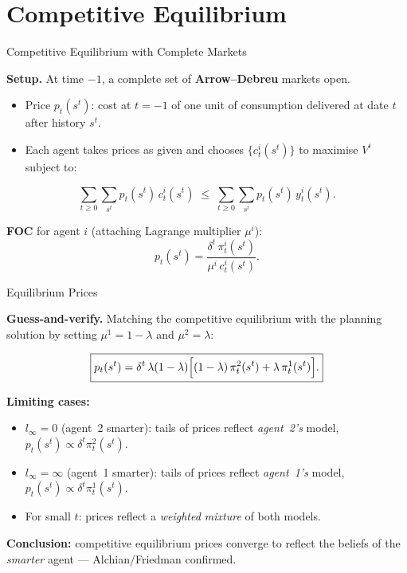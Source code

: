 \documentclass[aspectratio=169,12pt]{beamer}
\begin{document}
\section{Competitive Equilibrium}

\begin{frame}{Competitive Equilibrium with Complete Markets}

\textbf{Setup.} At time $-1$, a complete set of \textbf{Arrow--Debreu} markets open.

\begin{itemize}
  \item Price $p_t(s^t)$: cost at $t=-1$ of one unit of consumption delivered at
        date $t$ after history $s^t$.
  \item Each agent takes prices as given and chooses $\{c_t^i(s^t)\}$ to
        maximise $V^i$ subject to:
\end{itemize}
\[
  \sum_{t\geq 0}\sum_{s^t} p_t(s^t)\,c_t^i(s^t)
  \;\leq\;
  \sum_{t\geq 0}\sum_{s^t} p_t(s^t)\,y_t^i(s^t).
\]

\textbf{FOC} for agent $i$ (attaching Lagrange multiplier $\mu^i$):
\[
  p_t(s^t) = \frac{\delta^t\,\pi_t^i(s^t)}{\mu^i\,c_t^i(s^t)}.
\]

\end{frame}

\begin{frame}{Equilibrium Prices}

\textbf{Guess-and-verify.} Matching the competitive equilibrium with the
planning solution by setting $\mu^1=1-\lambda$ and $\mu^2=\lambda$:

\bigskip
\[
  \boxed{p_t(s^t) = \delta^t\,\lambda(1-\lambda)
    \Bigl[(1-\lambda)\,\pi_t^2(s^t)+\lambda\,\pi_t^1(s^t)\Bigr].}
\]

\bigskip
\textbf{Limiting cases:}

\begin{itemize}
  \item $l_\infty=0$ (agent~2 smarter): tails of prices reflect
        \emph{agent~2's} model, $p_t(s^t)\propto\delta^t\pi_t^2(s^t)$.
  \item $l_\infty=\infty$ (agent~1 smarter): tails of prices reflect
        \emph{agent~1's} model, $p_t(s^t)\propto\delta^t\pi_t^1(s^t)$.
  \item For small $t$: prices reflect a \emph{weighted mixture} of both models.
\end{itemize}

\bigskip
\textbf{Conclusion:} competitive equilibrium prices converge to reflect the
beliefs of the \emph{smarter} agent --- Alchian/Friedman confirmed.

\end{frame}
\end{document}
